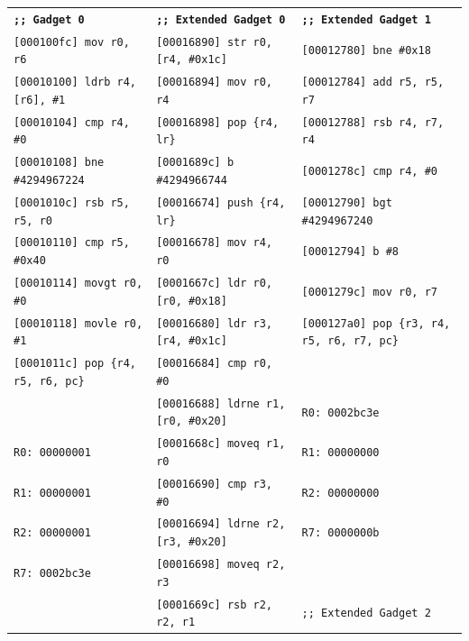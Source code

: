 \documentclass[9pt]{beamer}
\begin{document}
\begin{frame}{} %
\begin{center}
  
    {\tiny
      \begin{tabular}{l l l} \hline
        \textbf{\texttt{;; Gadget 0}} 			& \textbf{\texttt{;; Extended Gadget 0}}				& \textbf{\texttt{;; Extended Gadget 1}} \\ 
        \texttt{[000100fc]  mov r0, r6} 	& \texttt{[00016890]  str r0, [r4, \#0x1c]}		& \texttt{[00012780]  bne \#0x18} \\
        \texttt{[00010100]  ldrb r4, [r6], \#1} & \texttt{[00016894]  mov r0, r4}		& \texttt{[00012784]  add r5, r5, r7} \\
        \texttt{[00010104]  cmp r4, \#0}	& \texttt{[00016898]  pop \{r4, lr\}}			& \texttt{[00012788]  rsb r4, r7, r4} \\
        \texttt{[00010108]  bne \#4294967224} & \texttt{[0001689c]  b \#4294966744}	& \texttt{[0001278c]  cmp r4, \#0} \\
        \texttt{[0001010c]  rsb r5, r5, r0}	& \texttt{[00016674]  push \{r4, lr\}}		& \texttt{[00012790]  bgt \#4294967240} \\
        \texttt{[00010110]  cmp r5, \#0x40} & \texttt{[00016678]  mov r4, r0}		& \texttt{[00012794]  b \#8} \\
        \texttt{[00010114]  movgt r0, \#0}	& \texttt{[0001667c]  ldr r0, [r0, \#0x18]}	& \texttt{[0001279c]  mov r0, r7} \\
        \texttt{[00010118]  movle r0, \#1}	& \texttt{[00016680]  ldr r3, [r4, \#0x1c]}	& \texttt{[000127a0]  pop \{r3, r4, r5, r6, r7, pc\}} \\
        \texttt{[0001011c]  pop \{r4, r5, r6, pc\}} & \texttt{[00016684]  cmp r0, \#0}		& \\
 				& \texttt{[00016688]  ldrne r1, [r0, \#0x20]}	& \texttt{R0: 0002bc3e} \\
        \texttt{R0: 00000001} 			& \texttt{[0001668c]  moveq r1, r0}		& \texttt{R1: 00000000} \\
        \texttt{R1: 00000001} 			& \texttt{[00016690]  cmp r3, \#0}		& \texttt{R2: 00000000} \\
        \texttt{R2: 00000001} 			& \texttt{[00016694]  ldrne r2, [r3, \#0x20]}	& \texttt{R7: 0000000b} \\
        \texttt{R7: 0002bc3e} 			& \texttt{[00016698]  moveq r2, r3}		& \\
        & \texttt{[0001669c]  rsb r2, r2, r1}		& \texttt{;; Extended Gadget 2} \\

\end{tabular}}
\end{center}
\end{frame}
\end{document}
